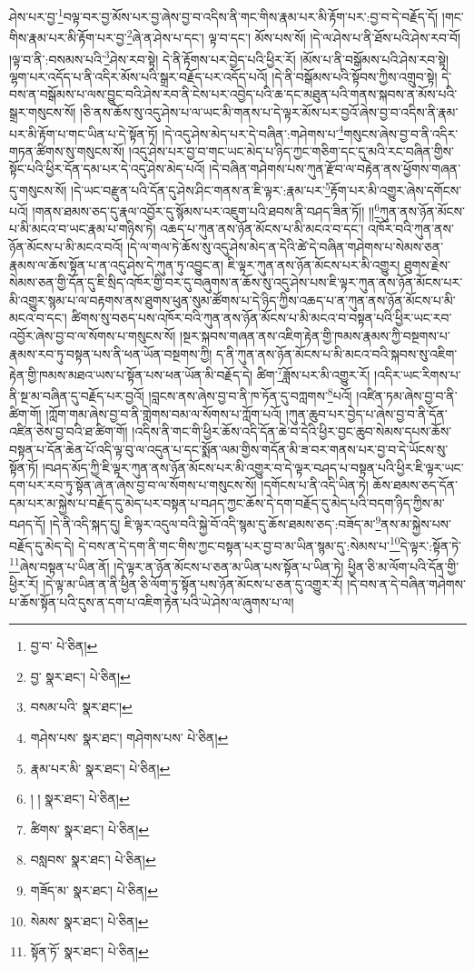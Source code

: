 ཤེས་པར་བྱ་\footnote{བྱ་བ་  པེ་ཅིན། }བལྟ་བར་བྱ་མོས་པར་བྱ་ཞེས་བྱ་བ་འདིས་ནི་གང་གིས་རྣམ་པར་མི་རྟོག་པར་:བྱ་བ་དེ་བརྗོད་དོ། །གང་གིས་རྣམ་པར་མི་རྟོག་པར་བྱ་\footnote{བྱ་  སྣར་ཐང་།  པེ་ཅིན། }ཞེ་ན་ཤེས་པ་དང་། ལྟ་བ་དང་། མོས་པས་སོ། །དེ་ལ་ཤེས་པ་ནི་ཐོས་པའི་ཤེས་རབ་བོ། །ལྟ་བ་ནི་:བསམས་པའི་\footnote{བསམ་པའི་  སྣར་ཐང་། }ཤེས་རབ་སྟེ། དེ་ནི་རྟོགས་པར་བྱེད་པའི་ཕྱིར་རོ། །མོས་པ་ནི་བསྒོམས་པའི་ཤེས་རབ་སྟེ། ལྷག་པར་འདོད་པ་ནི་འདིར་མོས་པའི་སྒྲར་བརྗོད་པར་འདོད་པའོ། །དེ་ནི་བསྒོམས་པའི་སྟོབས་ཀྱིས་འགྲུབ་སྟེ། དེ་བས་ན་བསྒོམས་པ་ལས་བྱུང་བའི་ཤེས་རབ་ནི་ངེས་པར་འབྱེད་པའི་ཆ་དང་མཐུན་པའི་གནས་སྐབས་ན་མོས་པའི་སྒྲར་གསུངས་སོ། །ཅི་ནས་ཆོས་སུ་འདུ་ཤེས་པ་ལ་ཡང་མི་གནས་པ་དེ་ལྟར་མོས་པར་བྱའོ་ཞེས་བྱ་བ་འདིས་ནི་རྣམ་པར་མི་རྟོག་པ་གང་ཡིན་པ་དེ་སྟོན་ཏོ། །དེ་འདུ་ཤེས་མེད་པར་དེ་བཞིན་:གཤེགས་པ་\footnote{གཤེས་པས་  སྣར་ཐང་། གཤེགས་པས་  པེ་ཅིན། }གསུངས་ཞེས་བྱ་བ་ནི་འདིར་གཏན་ཚིགས་སུ་གསུངས་སོ། །འདུ་ཤེས་པར་བྱ་བ་གང་ཡང་མེད་པ་ཉིད་ཀྱང་གཅིག་དང་དུ་མའི་རང་བཞིན་གྱིས་སྟོང་པའི་ཕྱིར་དོན་དམ་པར་དེ་འདུ་ཤེས་མེད་པའོ། །དེ་བཞིན་གཤེགས་པས་ཀུན་རྫོབ་ལ་བརྟེན་ནས་ཕྱོགས་གཞན་དུ་གསུངས་སོ། །དེ་ཡང་བརྫུན་པའི་དོན་དུ་ཤེས་ཤིང་གནས་ན་ཇི་ལྟར་:རྣམ་པར་\footnote{རྣམ་པར་མི་  སྣར་ཐང་།  པེ་ཅིན། }རྟོག་པར་མི་འགྱུར་ཞེས་དགོངས་པའོ། །གནས་ཐམས་ཅད་དུ་རྣལ་འབྱོར་དུ་སྙོམས་པར་འཇུག་པའི་ཐབས་ནི་བཤད་ཟིན་ཏོ།། །།\footnote{། །  སྣར་ཐང་།  པེ་ཅིན། }ཀུན་ནས་ཉོན་མོངས་པ་མི་མངའ་བ་ཡང་རྣམ་པ་གཉིས་ཏེ། འཆད་པ་ཀུན་ནས་ཉོན་མོངས་པ་མི་མངའ་བ་དང་། འཁོར་བའི་ཀུན་ནས་ཉོན་མོངས་པ་མི་མངའ་བའོ། །དེ་ལ་གལ་ཏེ་ཆོས་སུ་འདུ་ཤེས་མེད་ན་དེའི་ཚེ་དེ་བཞིན་གཤེགས་པ་སེམས་ཅན་རྣམས་ལ་ཆོས་སྟོན་པ་ན་འདུ་ཤེས་དེ་ཀུན་ཏུ་འབྱུང་ན། ཇི་ལྟར་ཀུན་ནས་ཉོན་མོངས་པར་མི་འགྱུར། ཐུགས་རྗེས་སེམས་ཅན་གྱི་དོན་དུ་ཇི་སྲིད་འཁོར་གྱི་བར་དུ་བཞུགས་ན་ཆོས་སུ་འདུ་ཤེས་པས་ཇི་ལྟར་ཀུན་ནས་ཉོན་མོངས་པར་མི་འགྱུར་སྙམ་པ་ལ་བརྟགས་ནས་ཐུགས་ཕུན་སུམ་ཚོགས་པ་དེ་ཉིད་ཀྱིས་འཆད་པ་ན་ཀུན་ནས་ཉོན་མོངས་པ་མི་མངའ་བ་དང་། ཚིགས་སུ་བཅད་པས་འཁོར་བའི་ཀུན་ནས་ཉོན་མོངས་པ་མི་མངའ་བ་བསྟན་པའི་ཕྱིར་ཡང་རབ་འབྱོར་ཞེས་བྱ་བ་ལ་སོགས་པ་གསུངས་སོ། །སྔར་སྐབས་གཞན་ནས་འཇིག་རྟེན་གྱི་ཁམས་རྣམས་ཀྱི་བསྔགས་པ་རྣམས་རབ་ཏུ་བསྟན་པས་ནི་ཕན་ཡོན་བསྔགས་ཀྱི། ད་ནི་ཀུན་ནས་ཉོན་མོངས་པ་མི་མངའ་བའི་སྐབས་སུ་འཇིག་རྟེན་གྱི་ཁམས་མཐའ་ཡས་པ་སྟོན་པས་ཕན་ཡོན་མི་བརྗོད་དེ། ཚིག་\footnote{ཚིགས་  སྣར་ཐང་།  པེ་ཅིན། }ཟློས་པར་མི་འགྱུར་རོ། །འདིར་ཡང་རིགས་པ་ནི་སྔ་མ་བཞིན་དུ་བརྗོད་པར་བྱའོ། །བླངས་ནས་ཞེས་བྱ་བ་ནི་ཁ་ཏོན་དུ་བཀླགས་\footnote{བསླབས་  སྣར་ཐང་།  པེ་ཅིན། }པའོ། །འཛིན་ཏམ་ཞེས་བྱ་བ་ནི་ཚིག་གོ། །ཀློག་གམ་ཞེས་བྱ་བ་ནི་གླེགས་བམ་ལ་སོགས་པ་ཀློག་པའོ། །ཀུན་ཆུབ་པར་བྱེད་པ་ཞེས་བྱ་བ་ནི་དོན་འཛིན་ཅེས་བྱ་བའི་ཐ་ཚིག་གོ། །འདིས་ནི་གང་གི་ཕྱིར་ཆོས་འདི་དོན་ཆེ་བ་དེའི་ཕྱིར་བྱང་ཆུབ་སེམས་དཔས་ཆོས་བསྟན་པ་དོན་ཆེན་པོ་འདི་ལྟ་བུ་ལ་འདུན་པ་དང་སྨོན་ལམ་གྱིས་གདོན་མི་ཟ་བར་གནས་པར་བྱ་བ་དེ་ཡོངས་སུ་སྟོན་ཏོ། །བཤད་མོད་ཀྱི་ཇི་ལྟར་ཀུན་ནས་ཉོན་མོངས་པར་མི་འགྱུར་བ་དེ་ལྟར་བཤད་པ་བསྟན་པའི་ཕྱིར་ཇི་ལྟར་ཡང་དག་པར་རབ་ཏུ་སྟོན་ཞེ་ན་ཞེས་བྱ་བ་ལ་སོགས་པ་གསུངས་སོ། །དགོངས་པ་ནི་འདི་ཡིན་ཏེ། ཆོས་ཐམས་ཅད་དོན་དམ་པར་མ་སྐྱེས་པ་བརྗོད་དུ་མེད་པར་བསྟན་པ་བཤད་ཀྱང་ཆོས་དེ་དག་བརྗོད་དུ་མེད་པའི་བདག་ཉིད་ཀྱིས་མ་བཤད་དོ། །དེ་ནི་འདི་སྐད་དུ། ཇི་ལྟར་འདུལ་བའི་སྐྱེ་བོ་འདི་སྙམ་དུ་ཆོས་ཐམས་ཅད་:བཟོད་མ་\footnote{གཟོད་མ་  སྣར་ཐང་།  པེ་ཅིན། }ནས་མ་སྐྱེས་པས་བརྗོད་དུ་མེད་དེ། དེ་བས་ན་དེ་དག་ནི་གང་གིས་ཀྱང་བསྟན་པར་བྱ་བ་མ་ཡིན་སྙམ་དུ་:སེམས་པ་\footnote{སེམས་  སྣར་ཐང་།  པེ་ཅིན། }དེ་ལྟར་:སྟོན་ཏེ་\footnote{སྟོན་ཏོ་  སྣར་ཐང་།  པེ་ཅིན། }ཞེས་བསྟན་པ་ཡིན་ནོ། །དེ་ལྟར་ན་ཉོན་མོངས་པ་ཅན་མ་ཡིན་པས་སྟོན་པ་ཡིན་ཏེ། ཕྱིན་ཅི་མ་ལོག་པའི་དོན་གྱི་ཕྱིར་རོ། །དེ་ལྟ་མ་ཡིན་ན་ནི་ཕྱིན་ཅི་ལོག་ཏུ་སྟོན་པས་ཉོན་མོངས་པ་ཅན་དུ་འགྱུར་རོ། །དེ་བས་ན་དེ་བཞིན་གཤེགས་པ་ཆོས་སྟོན་པའི་དུས་ན་དག་པ་འཇིག་རྟེན་པའི་ཡེ་ཤེས་ལ་ཞུགས་པ་ལ། 